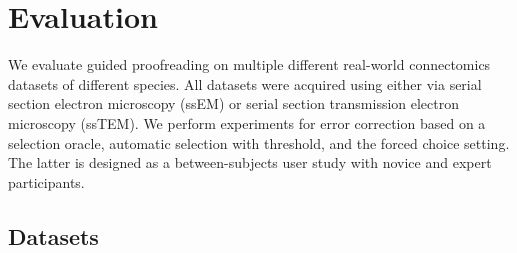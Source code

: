 
\section{Evaluation}
\label{sec:evaluation}

We evaluate guided proofreading on multiple different real-world connectomics datasets of different species. All datasets were acquired using either via serial section electron microscopy (ssEM) or serial section transmission electron microscopy (ssTEM). We perform experiments for error correction based on a selection oracle, automatic selection with threshold, and the forced choice setting. The latter is designed as a between-subjects user study with novice and expert participants.

\subsection{Datasets}


